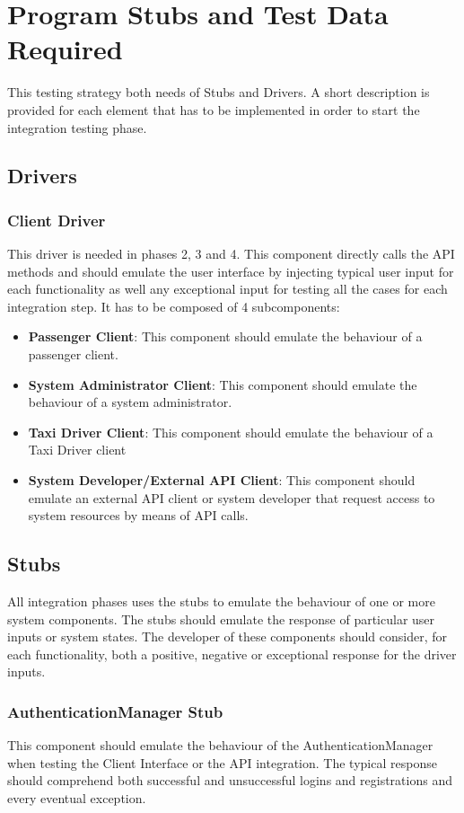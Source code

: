 \documentclass[11pt, a4paper,titlepage]{article}
\begin{document}
	\section{Program Stubs and Test Data Required}
	This testing strategy both needs of Stubs and Drivers. A short description is provided for each element that has to be implemented in order to start the integration testing phase.
		\subsection{Drivers}
		\subsubsection{Client Driver}
		This driver is needed in phases 2, 3 and 4. This component directly calls the API methods and should emulate the user interface by injecting typical user input for each functionality as well any exceptional input for testing all the cases for each integration step. \newline 
		It has to be composed of 4 subcomponents: 
		\begin{itemize}
			\item \textbf{Passenger Client}: This component should emulate the behaviour of a passenger client.
			\item \textbf{System Administrator Client}: This component should emulate the behaviour of a system administrator.
			\item \textbf{Taxi Driver Client}: This component should emulate the behaviour of a Taxi Driver client
			\item\textbf{ System Developer/External API Client}: This component should emulate an external API client or system developer that request access to system resources by means of API calls.
		\end{itemize}
		
		\subsection{Stubs}
		All integration phases uses the stubs to emulate the behaviour of one or more system components. The stubs should emulate the response of particular user inputs or system states.
		The developer of these components should consider, for each functionality, both a positive, negative or exceptional response for the driver inputs.
			\subsubsection{AuthenticationManager Stub}
			This component should emulate the behaviour of the AuthenticationManager when testing the Client Interface or the API integration. \newline
			The typical response should comprehend both successful and unsuccessful logins and registrations and every eventual exception.
\end{document}
